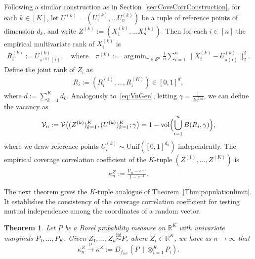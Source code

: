 \documentclass[11pt]{article}
\newtheorem{thm}{Theorem}
\DeclareMathOperator*{\argmin}{arg\,min}
\newcommand{\pto}{\xrightarrow{\,\mathrm{p}\,} }
\begin{document}
Following a similar construction as in Section~\ref{sec:CoveCorrConstruction}, for each $k \in [K]$, let ${U}^{(k)} = (U^{(k)}_1, \ldots U^{(k)}_n)$ be a tuple of reference points of dimension $d_k$, and write ${Z}^{(k)} := (X_1^{(k)}, \ldots X_n^{(k)})$. Then for each $i \in [n]$ the empirical multivariate rank of $X_i^{(k)}$ is 
\begin{align}
R^{(k)}_i := U^{(k)}_{\pi^{(k)}(i)}, \quad \text{where} \quad \pi^{(k)} := \argmin_{\pi \in \mathcal{S}^n} \frac{1}{n} \sum_{i = 1}^n \|X_i^{(k)} - U^{(k)}_{\pi(i)}\|_2^2. \label{eq:MultiRankKsample}
\end{align}
Define the joint rank of $Z_i$ as 
\begin{align}
R_i  := (R_i^{(1)}, \ldots, R_i^{(K)}) \in [0, 1]^{d}, \label{eq:JointRankKcomponent}
\end{align}
where $d :=\sum_{k = 1}^K d_k$. Analogously to~\eqref{eq:VnGen}, letting $\gamma = \frac{1}{2n^{1/d}}$, we can define the vacancy as
\[
 \mathcal{V}_{n}:= \mathcal{V} \bigl(({Z}^{(k)})_{k = 1}^K, ({U}^{(k)})_{k = 1}^K; \gamma\bigr) = 1 - \mathrm{vol}\Bigl(\bigcup_{i = 1}^n B(R_i, \gamma)\Bigr),
\]
where we draw reference points $U^{(k)}_i \sim \mathrm{Unif}([0,1]^{d_k})$ independently. The empirical coverage correlation coefficient of the $K$-tuple $(Z^{(1)}, \ldots, Z^{(K)})$ is 
\begin{align}
\kappa_n^{Z} := \frac{ \mathcal{V}_{n} - e^{-1}}{1 - e^{-1}}. \label{eq:CovCorrKComponent}
\end{align}

The next theorem gives the $K$-tuple analogue of Theorem~\ref{Thm:populationlimit}. It establishes the consistency of the coverage correlation coefficient for testing mutual independence among the coordinates of a random vector.
\begin{thm}
\label{thm:KVariateCoverageConsistency}
    Let $P$ be a Borel probability measure on $\mathbb{R}^K$ with univariate marginals $P_1, \ldots, P_K$. Given $Z_1, \ldots, Z_n \stackrel{\mathrm{iid}}{\sim} P$, where $Z_i \in \mathbb{R}^K$, we have as $n\to\infty$ that 
    \[
    \kappa_n^Z  \pto \kappa^{Z}:= D_{f_{\mathrm{cov}}}(P \| \otimes_{i = 1}^K P_i).
    \]
\end{thm}
\end{document}
